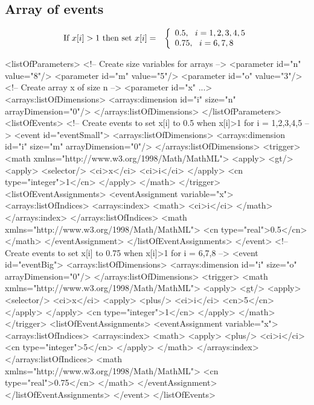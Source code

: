 \subsection{Array of events}

\begin{eqnarray*}
\textup{If }x[i] > 1\textup{ then set }x[i] & = & \left\{ \begin{array}{l}
0.5,~~i = 1,2,3,4,5 \\
0.75,~~i = 6,7,8
\end{array}
\right.
\end{eqnarray*}

\begin{example}
<listOfParameters>
 <!-- Create size variables for arrays -->
 <parameter id="n" value="8"/>
 <parameter id="m" value="5"/>
 <parameter id="o" value="3"/>
 <!-- Create array x of size n -->
 <parameter id="x" ...> 
  <arrays:listOfDimensions>
   <arrays:dimension id="i" size="n" arrayDimension="0"/>
  </arrays:listOfDimensions>
</listOfParameters>
<listOfEvents>
 <!-- Create events to set x[i] to 0.5 when x[i]>1 for i = 1,2,3,4,5 -->
 <event id="eventSmall">
  <arrays:listOfDimensions>
   <arrays:dimension id="i" size="m" arrayDimension="0"/>
  </arrays:listOfDimensions>
  <trigger>
   <math xmlns="http://www.w3.org/1998/Math/MathML">
     <apply>
       <gt/>
         <apply>
           <selector/>
           <ci>x</ci>
           <ci>i</ci>
         </apply>
       <cn type="integer">1</cn>
     </apply>
   </math>
  </trigger>
  <listOfEventAssignments>
   <eventAssignment variable="x">
    <arrays:listOfIndices>
     <arrays:index>
      <math>
       <ci>i</ci>
      </math>
     </arrays:index>
    </arrays:listOfIndices>
    <math xmlns="http://www.w3.org/1998/Math/MathML">
     <cn type="real">0.5</cn>
    </math>
   </eventAssignment>
  </listOfEventAssignments>
 </event>
 <!-- Create events to set x[i] to 0.75 when x[i]>1 for i = 6,7,8 -->
 <event id="eventBig">
  <arrays:listOfDimensions>
   <arrays:dimension id="i" size="o" arrayDimension="0"/>
  </arrays:listOfDimensions>
  <trigger>
    <math xmlns="http://www.w3.org/1998/Math/MathML">
      <apply>
        <gt/>
          <apply>
            <selector/>
            <ci>x</ci>
            <apply>
              <plus/>
                <ci>i</ci>
                <cn>5</cn>
            </apply>
          </apply>
          <cn type="integer">1</cn>
      </apply>
    </math>
  </trigger>
  <listOfEventAssignments>
   <eventAssignment variable="x">
    <arrays:listOfIndices>
     <arrays:index>
      <math>
       <apply>
          <plus/>
            <ci>i</ci>
            <cn type="integer">5</cn>
       </apply> 
      </math>
     </arrays:index>
    </arrays:listOfIndices>
    <math xmlns="http://www.w3.org/1998/Math/MathML">
     <cn type="real">0.75</cn>
    </math>
   </eventAssignment>
  </listOfEventAssignments>
 </event>
</listOfEvents>
\end{example}

